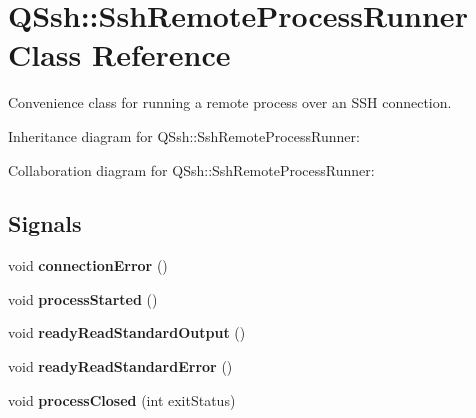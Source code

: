 \hypertarget{class_q_ssh_1_1_ssh_remote_process_runner}{}\section{Q\+Ssh\+:\+:Ssh\+Remote\+Process\+Runner Class Reference}
\label{class_q_ssh_1_1_ssh_remote_process_runner}


Convenience class for running a remote process over an S\+SH connection.  




Inheritance diagram for Q\+Ssh\+:\+:Ssh\+Remote\+Process\+Runner\+:


Collaboration diagram for Q\+Ssh\+:\+:Ssh\+Remote\+Process\+Runner\+:
\subsection*{Signals}
\begin{DoxyCompactItemize}
\item 
\mbox{\label{class_q_ssh_1_1_ssh_remote_process_runner_a8929ace2d2d34ebc722d725931400f9b}} 
void {\bfseries connection\+Error} ()
\item 
\mbox{\label{class_q_ssh_1_1_ssh_remote_process_runner_a4fb67e1942a3905fa203ee10c70a64db}} 
void {\bfseries process\+Started} ()
\item 
\mbox{\label{class_q_ssh_1_1_ssh_remote_process_runner_ada10726aa58b590c99bd1bcc1382db20}} 
void {\bfseries ready\+Read\+Standard\+Output} ()
\item 
\mbox{\label{class_q_ssh_1_1_ssh_remote_process_runner_a6df0c2aef729a5fa881d387c1bf9ce23}} 
void {\bfseries ready\+Read\+Standard\+Error} ()
\item 
\mbox{\label{class_q_ssh_1_1_ssh_remote_process_runner_a111e595c5e79f98bb9f429beb31c68e2}} 
void {\bfseries process\+Closed} (int exit\+Status)
\end{DoxyCompactItemize}

